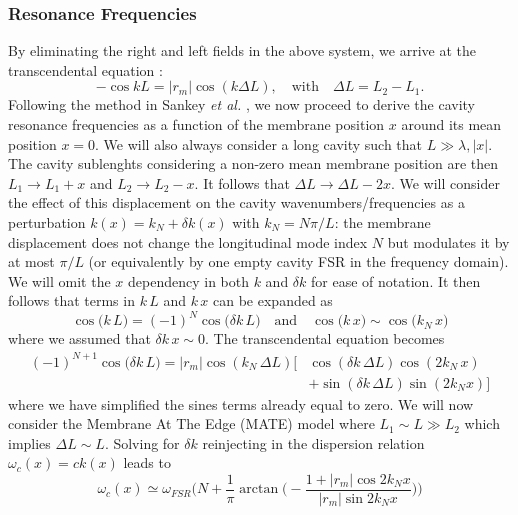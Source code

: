 \subsubsection{Resonance Frequencies}
By eliminating the right and left fields in the above system, we arrive at the transcendental equation \cite{jayich_dispersive_2008}:
\begin{equation}
  -\cos kL = |r_m|\cos (k \Delta L), \quad \text{with} \quad \Delta L = L_2 - L_1.
\end{equation}
Following the method in Sankey \textit{et al.} \cite{sankey_strong_2010}, we now proceed to derive the cavity resonance frequencies as a function of the membrane position \(x\) around its mean position \(x=0\). We will also always consider a long cavity such that \( L \gg \lambda,|x| \). The cavity sublenghts considering a non-zero mean membrane position are then \(L_1 \rightarrow L_1 +  x\) and \(L_2 \rightarrow L_2 -  x\). It follows that $\Delta L \rightarrow \Delta L - 2x$. We will consider the effect of this displacement on the cavity wavenumbers/frequencies as a perturbation $k(x) = k_N + \delta k(x)$ with $k_N = N \pi/L$: the membrane displacement does not change the longitudinal mode index \(N\) but modulates it by at most $\pi/L$ (or equivalently by one empty cavity FSR in the frequency domain). We will omit the $x$ dependency in both $k$ and $\delta k$ for ease of notation. It then follows that terms in $k\, L$ and $k\, x$ can be expanded as
\begin{equation*}
    \cos \big( k \, L \big)  = (-1)^N \cos \big( \delta k \,L \big) \quad \text{and} \quad      \cos \big( k \, x \big)  \sim \cos \big( k_N \,  x \big)  
\end{equation*}
where we assumed that $\delta k \, x \sim 0$. The transcendental equation becomes
\begin{equation}
  \begin{split}
  (-1)^{N+1} \cos \big( \delta k \,L \big) = |r_m|\cos (k_N \,\Delta L) \Big[ &\cos( \delta k \,  \Delta L) \cos (2 k_N\, x) \\ 
  & +  \sin(\delta k \,  \Delta L) \sin(2 k_N x) \Big]  
  \end{split}
\end{equation}
where we have simplified the sines terms already equal to zero. 
We will now consider the Membrane At The Edge (MATE) model where $L_1 \sim L \gg L_2 $ which implies $ \Delta L \sim L$. Solving for $\delta k$ reinjecting in the dispersion relation $\omega_c(x) = c k(x)$ leads to
\begin{equation}
    \omega_c(x)  \simeq \omega_{FSR} \Bigg( N  + \frac{1}{\pi} \arctan \bigg( -  \dfrac{1 + |r_m|\cos 2 k_N  x}{|r_m|\sin 2 k_N x} \bigg)\Bigg)
\end{equation}
